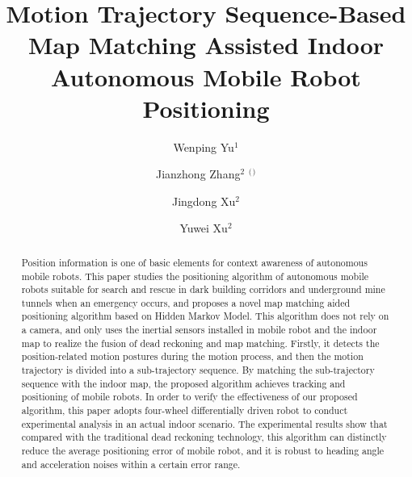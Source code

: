\documentclass{llncs}
\begin{document}
%
\title{Motion Trajectory Sequence-Based Map Matching Assisted Indoor Autonomous Mobile Robot Positioning}
%

\author{Wenping Yu$^1$ \and Jianzhong Zhang$^2$ $^($\Envelope$^)$ \and Jingdong Xu$^2$ \and Yuwei Xu$^2$}
%
%
%


\maketitle              %

\begin{abstract}

Position information is one of basic elements for context awareness of autonomous mobile robots. This paper studies the positioning algorithm of autonomous mobile robots suitable for search and rescue in dark building corridors and underground mine tunnels when an emergency occurs, and proposes a novel map matching aided positioning algorithm based on Hidden Markov Model. This algorithm does not rely on a camera, and only uses the inertial sensors installed in mobile robot and the indoor map to realize the fusion of dead reckoning and map matching. Firstly, it detects the position-related motion postures during the motion process, and then the motion trajectory is divided into a sub-trajectory sequence. By matching the sub-trajectory sequence with the indoor map, the proposed algorithm achieves tracking and positioning of mobile robots. In order to verify the effectiveness of our proposed algorithm, this paper adopts four-wheel differentially driven robot to conduct experimental analysis in an actual indoor scenario. The experimental results show that compared with the traditional dead reckoning technology, this algorithm can distinctly reduce the average positioning error of mobile robot, and it is robust to heading angle and acceleration noises within a certain error range.

\end{abstract}
%
\end{document}
